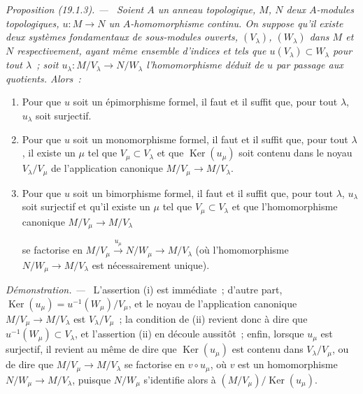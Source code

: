 \documentclass[10pt,oneside]{book}
\makeatletter
\newcommand{\setmanualcurrentlabel}[1]{\def\@currentlabel{#1}}
\newcommand{\oldpage}[2][]{%
  \setcounter{footnote}{0}%
  \marginpar{\scriptsize\textbf{#1}~|~#2}\ignorespaces}
\newenvironment{proposition}[1][]{%
  \setmanualcurrentlabel{#1}\par\medskip\noindent\itshape Proposition (#1). ---\ }{\par}
\newenvironment{proof}{%
  \par\medskip\noindent\textit{Démonstration. ---\ }}{\par}
\makeatother
\begin{document}
\begin{proposition}[19.1.3]
\label{0.19.1.3-fr}
Soient $A$ un anneau topologique, $M$, $N$ deux $A$-modules topologiques,
$u:M\to N$ un $A$-homomorphisme continu. On suppose qu'il existe deux systèmes
fondamentaux de sous-modules ouverts, $(V_\lambda)$, $(W_\lambda)$ dans $M$ et
$N$ respectivement, ayant même ensemble d'indices et tels que
$u(V_\lambda)\subset W_\lambda$ pour tout $\lambda$~; soit
$u_\lambda:M/V_\lambda\to N/W_\lambda$ l'homomorphisme déduit de $u$ par
passage aux quotients. Alors~:
\begin{enumerate}
  \item[(i)] Pour que $u$ soit un épimorphisme formel, il faut et il suffit que,
  pour tout $\lambda$, $u_\lambda$ soit surjectif.
  \item[(ii)] Pour que $u$ soit un monomorphisme formel, il faut et il suffit
  que, pour tout $\lambda$, il existe un $\mu$ tel que
  $V_\mu\subset V_\lambda$ et que $\operatorname{Ker}(u_\mu)$ soit contenu
  dans le noyau $V_\lambda/V_\mu$ de l'application canonique
  $M/V_\mu\to M/V_\lambda$.
  \item[(iii)] Pour que $u$ soit un bimorphisme formel, il faut et il suffit
  que, pour tout $\lambda$, $u_\lambda$ soit surjectif et qu'il existe un
  $\mu$ tel que $V_\mu\subset V_\lambda$ et que l'homomorphisme canonique
  $M/V_\mu\to M/V_\lambda$

  \oldpage[0\textsubscript{IV-1}]{72}

  \noindent se factorise en
  $M/V_\mu\xrightarrow{u_\mu}N/W_\mu\to M/V_\lambda$ (où
  l'homomorphisme $N/W_\mu\to M/V_\lambda$ est nécessairement unique).
\end{enumerate}
\end{proposition}

\begin{proof}
L'assertion (i) est immédiate~; d'autre part,
$\operatorname{Ker}(u_\mu)=u^{-1}(W_\mu)/V_\mu$, et le noyau de l'application
canonique $M/V_\mu\to M/V_\lambda$ est $V_\lambda/V_\mu$~; la condition de
(ii) revient donc à dire que $u^{-1}(W_\mu)\subset V_\lambda$, et l'assertion
(ii) en découle aussitôt~; enfin, lorsque $u_\mu$ est surjectif, il revient au
même de dire que $\operatorname{Ker}(u_\mu)$ est contenu dans
$V_\lambda/V_\mu$, ou de dire que $M/V_\mu\to M/V_\lambda$ se factorise en
$v\circ u_\mu$, où $v$ est un homomorphisme
$N/W_\mu\to M/V_\lambda$, puisque $N/W_\mu$ s'identifie alors à
$(M/V_\mu)/\operatorname{Ker}(u_\mu)$.
\end{proof}
\end{document}
